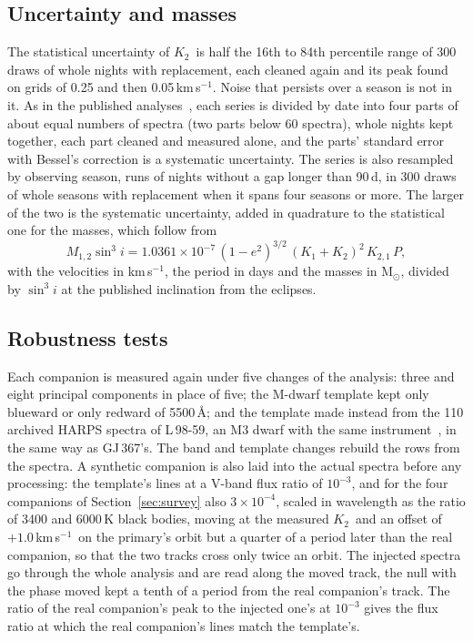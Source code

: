 \documentclass[3p,11pt]{elsarticle}
\newcommand{\kms}{km\,s$^{-1}$}
\newcommand{\Msun}{M$_\odot$}
\newcommand{\Ktwo}{$K_2$}
\begin{document}
\subsection{Uncertainty and masses}\label{sec:uncertainty}

The statistical uncertainty of \Ktwo\ is half the 16th to 84th percentile range of 300 draws of
whole nights with replacement, each cleaned again and its peak found on grids of 0.25 and then
0.05\,\kms. Noise that persists over a season is not in it. As in the published
analyses~\cite{Sebastian2024b,Stevenson2026}, each series is divided by date into four parts of
about equal numbers of spectra (two parts below 60 spectra), whole nights kept together, each part
cleaned and measured alone, and the parts' standard error with Bessel's correction is a systematic
uncertainty. The series is also resampled by observing season, runs of nights without a gap
longer than 90\,d, in 300 draws of whole seasons with replacement when it spans four seasons or
more. The larger of the two is the systematic uncertainty, added in quadrature to the statistical
one for the masses, which follow from
\begin{equation}
M_{1,2}\sin^3 i = 1.0361\times10^{-7}\,(1-e^2)^{3/2}\,(K_1+K_2)^2\,K_{2,1}\,P ,
\end{equation}
with the velocities in \kms, the period in days and the masses in \Msun, divided by $\sin^3 i$ at
the published inclination from the eclipses.

\subsection{Robustness tests}\label{sec:robust}

Each companion is measured again under five changes of the analysis: three and eight principal
components in place of five; the M-dwarf template kept only blueward or only redward of 5500\,\AA;
and the template made instead from the 110 archived HARPS spectra of L\,98-59, an M3 dwarf with
the same instrument~\cite{Cloutier2019}, in the same way as GJ\,367's. The band and template
changes rebuild the rows from the spectra. A synthetic companion is also laid into the actual
spectra before any processing: the template's lines at a V-band flux ratio of $10^{-3}$, and for
the four companions of Section~\ref{sec:survey} also $3\times10^{-4}$, scaled in wavelength as the
ratio of 3400 and 6000\,K black bodies, moving at the measured \Ktwo\ and an offset of $+1.0$\,\kms\
on the primary's orbit but a quarter of a period later than the real companion, so that the two
tracks cross only twice an orbit. The injected spectra go through the whole analysis and are read
along the moved track, the null with the phase moved kept a tenth of a period from the real
companion's track. The ratio of the real companion's peak to the injected one's at $10^{-3}$ gives
the flux ratio at which the real companion's lines match the template's.
\end{document}

